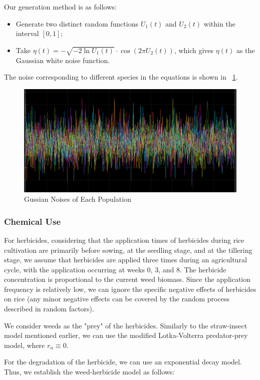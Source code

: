 \documentclass{HZNUMCM}
\begin{document}
        Our generation method is as follows:
        \begin{itemize}
            \item Generate two distinct random functions \(U_1(t)\) and \(U_2(t)\) within the interval \([0, 1]\);
            \item Take \(\eta(t) = -\sqrt{-2 \ln U_1(t)} \cdot \cos(2\pi U_2(t))\), which gives \(\eta(t)\) as the Gaussian white noise function.
        \end{itemize}
        The noise corresponding to different species in the equations is shown in \figurename~\ref{fig:GussianNoise}.
        \begin{figure}[H]
          \centering
          \includegraphics[width=0.5\linewidth]{images/GussianNoise.png}
          \caption{Gussian Noises of Each Population}
          \label{fig:GussianNoise}
        \end{figure}
      \subsubsection{Chemical Use}
        For herbicides, considering that the application times of herbicides during rice cultivation are primarily before sowing, 
        at the seedling stage, and at the tillering stage, we assume that herbicides are applied three times during an agricultural cycle, 
        with the application occurring at weeks 0, 3, and 8. The herbicide concentration is proportional to the current weed biomass. 
        Since the application frequency is relatively low, we can ignore the specific negative effects of herbicides on rice 
        (any minor negative effects can be covered by the random process described in random factors).

        We consider weeds as the "prey" of the herbicides. 
        Similarly to the straw-insect model mentioned earlier, we can use the modified Lotka-Volterra predator-prey model, where \( r_n \equiv 0 \).
      
        For the degradation of the herbicide, we can use an exponential decay model. Thus, we establish the weed-herbicide model as follows:
      
\end{document}
